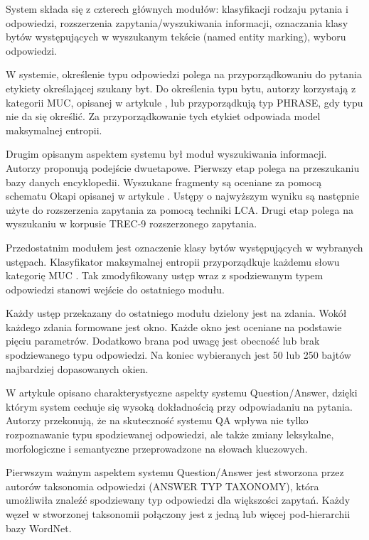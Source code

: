 System składa się z czterech głównych modułów: klasyfikacji rodzaju pytania i odpowiedzi, rozszerzenia zapytania/wyszukiwania informacji, oznaczania klasy bytów występujących w wyszukanym tekście (named entity marking), wyboru odpowiedzi. 

W systemie, określenie typu odpowiedzi polega na przyporządkowaniu do pytania etykiety określającej szukany byt. Do określenia typu bytu, autorzy korzystają z kategorii MUC, opisanej w artykule \cite{chinchor-robinson-1998-appendix}, lub przyporządkują typ PHRASE, gdy typu nie da się określić. Za przyporządkowanie tych etykiet odpowiada model maksymalnej entropii. 

Drugim opisanym aspektem systemu był moduł wyszukiwania informacji. Autorzy proponują podejście dwuetapowe. Pierwszy etap polega na przeszukaniu bazy danych encyklopedii. Wyszukane fragmenty są oceniane za pomocą schematu Okapi opisanej w artykule \cite{RobertsonOkapi}. Ustępy o najwyższym wyniku są następnie użyte do rozszerzenia zapytania za pomocą techniki LCA. Drugi etap polega na wyszukaniu w korpusie TREC-9 rozszerzonego zapytania.

Przedostatnim modułem jest oznaczenie klasy bytów występujących w wybranych ustępach. Klasyfikator maksymalnej entropii przyporządkuje każdemu słowu kategorię MUC \cite{chinchor-robinson-1998-appendix}. Tak zmodyfikowany ustęp wraz z spodziewanym typem odpowiedzi stanowi wejście do ostatniego modułu.

Każdy ustęp przekazany do ostatniego modułu dzielony jest na zdania. Wokół każdego zdania formowane jest okno. Każde okno jest oceniane na podstawie pięciu parametrów. Dodatkowo brana pod uwagę jest obecność lub brak spodziewanego typu odpowiedzi. Na koniec wybieranych jest 50 lub 250 bajtów najbardziej dopasowanych okien. 

W artykule \cite{hpqa} opisano charakterystyczne aspekty systemu Question/Answer, dzięki którym system cechuje się wysoką dokładnością przy odpowiadaniu na pytania. Autorzy przekonują, że na skuteczność systemu QA wpływa nie tylko rozpoznawanie typu spodziewanej odpowiedzi, ale także zmiany leksykalne, morfologiczne i semantyczne przeprowadzone na słowach kluczowych.

Pierwszym ważnym aspektem systemu Question/Answer jest stworzona przez autorów taksonomia odpowiedzi (ANSWER TYP TAXONOMY), która umożliwiła znaleźć spodziewany typ odpowiedzi dla większości zapytań. Każdy węzeł w stworzonej taksonomii połączony jest z jedną lub więcej pod-hierarchii bazy WordNet. 

